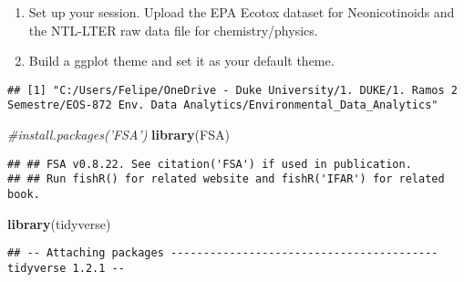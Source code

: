 \documentclass[]{article}
\newenvironment{Shaded}{\begin{snugshade}}{\end{snugshade}}
\newcommand{\KeywordTok}[1]{\textcolor[rgb]{0.13,0.29,0.53}{\textbf{#1}}}
\newcommand{\DataTypeTok}[1]{\textcolor[rgb]{0.13,0.29,0.53}{#1}}
\newcommand{\CommentTok}[1]{\textcolor[rgb]{0.56,0.35,0.01}{\textit{#1}}}
\newcommand{\OtherTok}[1]{\textcolor[rgb]{0.56,0.35,0.01}{#1}}
\newcommand{\OperatorTok}[1]{\textcolor[rgb]{0.81,0.36,0.00}{\textbf{#1}}}
\newcommand{\NormalTok}[1]{#1}
\begin{document}
\begin{enumerate}
\def\labelenumi{\arabic{enumi}.}
\item
  Set up your session. Upload the EPA Ecotox dataset for Neonicotinoids
  and the NTL-LTER raw data file for chemistry/physics.
\item
  Build a ggplot theme and set it as your default theme.
\end{enumerate}

\begin{Shaded}
\end{Shaded}

\begin{verbatim}
## [1] "C:/Users/Felipe/OneDrive - Duke University/1. DUKE/1. Ramos 2 Semestre/EOS-872 Env. Data Analytics/Environmental_Data_Analytics"
\end{verbatim}

\begin{Shaded}
\begin{Highlighting}[]
\CommentTok{#install.packages('FSA')}
\KeywordTok{library}\NormalTok{(FSA)}
\end{Highlighting}
\end{Shaded}

\begin{verbatim}
## ## FSA v0.8.22. See citation('FSA') if used in publication.
## ## Run fishR() for related website and fishR('IFAR') for related book.
\end{verbatim}

\begin{Shaded}
\begin{Highlighting}[]
\KeywordTok{library}\NormalTok{(tidyverse)}
\end{Highlighting}
\end{Shaded}

\begin{verbatim}
## -- Attaching packages ----------------------------------------- tidyverse 1.2.1 --
\end{verbatim}
\end{document}
